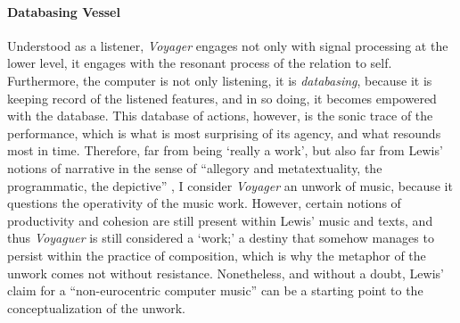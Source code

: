 \paragraph{Databasing Vessel}
Understood as a listener, \textit{Voyager} engages not only with signal processing at the lower level, it engages with the resonant process of the relation to self. Furthermore, the computer is not only listening, it is \textit{databasing}, because it is keeping record of the listened features, and in so doing, it becomes empowered with the database. This database of actions, however, is the sonic trace of the performance, which is what is most surprising of its agency, and what resounds most in time. Therefore, far from being `really a work', but also far from Lewis' notions of narrative in the sense of ``allegory and metatextuality, the programmatic, the depictive'' \parencite[110]{Lew99:Int}, I consider \textit{Voyager} an unwork of music, because it questions the operativity of the music work. However, certain notions of productivity and cohesion are still present within Lewis' music and texts, and thus \textit{Voyaguer} is still considered a `work;' a destiny that somehow manages to persist within the practice of composition, which is why the metaphor of the unwork comes not without resistance. Nonetheless, and without a doubt, Lewis' claim for a ``non-eurocentric computer music'' \parencite[107]{Lew99:Int} can be a starting point to the conceptualization of the unwork.

